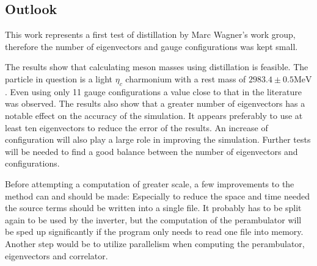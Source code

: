 \subsection{Outlook}

This work represents a first test of distillation by Marc Wagner's work group, therefore the number of eigenvectors and gauge configurations was kept small.

The results show that calculating meson masses using distillation is feasible. The particle in question is a light $\eta_c$ charmonium with a rest mass of $2983.4 \pm 0.5 \text{MeV}$ \cite{pdglive}. Even using only 11 gauge configurations a value close to that in the literature was observed. The results also show that a greater number of eigenvectors has a notable effect on the accuracy of the simulation. It appears preferably to use at least ten eigenvectors to reduce the error of the results. An increase of configuration will also play a large role in improving the simulation. Further tests will be needed to find a good balance between the number of eigenvectors and configurations.

Before attempting a computation of greater scale, a few improvements to the method can and should be made: Especially to reduce the space and time needed the source terms should be written into a single file. It probably has to be split again to be used by the inverter, but the computation of the perambulator will be sped up significantly if the program only needs to read one file into memory. Another step would be to utilize parallelism when computing the perambulator, eigenvectors and correlator.